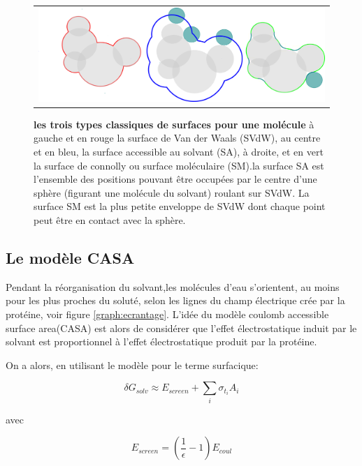   \begin{figure}[!htbp]
     \centering
     \begin{tabular}{c}
       \includegraphics[width=12cm]{figure/surface.png} &
     \end{tabular}
     
     \caption{\textbf{les trois types classiques de surfaces pour une molécule} à gauche et en rouge la surface de Van der Waals (SVdW), au centre et en bleu, la surface accessible au solvant (SA), à droite, et en vert  la surface de connolly ou surface moléculaire (SM).la surface SA est l'ensemble des positions pouvant être occupées par le centre d'une sphère (figurant une molécule du solvant) roulant sur SVdW. La surface SM est la plus petite enveloppe de SVdW dont chaque point peut être en contact avec la sphère. } 
\label{graph:surface}
   \end{figure}
   

\subsection{Le modèle CASA}

Pendant la réorganisation du solvant,les molécules d'eau s'orientent, au moins pour les plus proches du soluté, selon les lignes du champ électrique crée par la protéine, voir figure \ref{graph:ecrantage}. L'idée du modèle \og coulomb accessible surface area\fg (CASA) est alors de considérer que l'effet électrostatique induit par le solvant est proportionnel à l'effet électrostatique produit par la protéine. 

On a  alors, en utilisant le modèle  pour le terme surfacique:

\begin{equation}
\delta G_{solv} \approx E_{screen} + \sum_i \sigma_{t_i} A_i
\end{equation}

avec 

\begin{equation}
E_{screen} =  (\frac{1}{\epsilon} -1 )E_{coul}
\end{equation}

